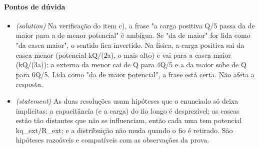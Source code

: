 \documentclass{article}%
\begin{document}
\paragraph{Pontos de dúvida}%
\begin{itemize}%
\item%
\textit{(solution)} Na verificação do item c), a frase "a carga positiva Q/5 passa da de maior para a de menor potencial" é ambígua. Se "da de maior" for lida como "da casca maior", o sentido fica invertido. Na física, a carga positiva sai da casca menor (potencial kQ/(2a), o mais alto) e vai para a casca maior (kQ/(3a)): a externa da menor cai de Q para 4Q/5 e a da maior sobe de Q para 6Q/5. Lida como "da de maior potencial", a frase está certa. Não afeta a resposta.%
\item%
\textit{(statement)} As duas resoluções usam hipóteses que o enunciado só deixa implícitas: a capacitância (e a carga) do fio longo é desprezível; as cascas estão tão distantes que não se influenciam, então cada uma tem potencial kq\_ext/R\_ext; e a distribuição não muda quando o fio é retirado. São hipóteses razoáveis e compatíveis com as observações da prova.%
\end{itemize}%
\end{document}
